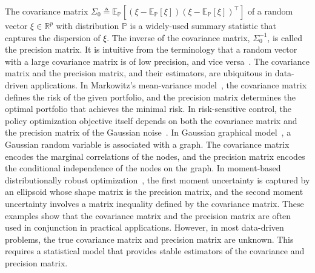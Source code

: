 \documentclass[11pt]{article}
\def\P{\mathbb{P}}
\def\R{\mathbb{R}}
\newcommand{\Let}{\triangleq}
\def\transpose{\top}
\def\P{\mathbb{P}}
\def\PP{\mathbb{P}}
\def\R{\mathbb{R}}
\def\E {\mathbb{E}}
\begin{document}
 The covariance matrix $\Sigma_0\Let\E_{\P}[(\xi-\E_{\P}[\xi])(\xi-\E_{\P}[\xi])^\transpose]$ of a random vector $\xi \in \R^p$ with distribution $\PP$ is a widely-used summary statistic that captures the dispersion of $\xi$. The inverse of the covariance matrix, $\Sigma_0^{-1}$, is called the precision matrix. It is intuitive from the terminology that a random vector with a large covariance matrix is of low precision, and vice versa~\citep{ref:nguyen2022distributionally}. 
The covariance matrix and the precision matrix, and their estimators, are ubiquitous in data-driven applications.
In Markowitz's mean-variance model~\citep{ref:Mark1952}, the covariance matrix defines the risk of the given portfolio, and the precision matrix determines the optimal portfolio that achieves the minimal risk. In risk-sensitive control, the policy optimization objective itself depends on both the covariance matrix and the precision matrix of the Gaussian noise~\citep[Appendix~1]{ref:wang2020game}. In Gaussian graphical model~\citep{ref:yuan2007model,ref:zhao2019cancer}, a Gaussian random variable is associated with a graph. The covariance matrix encodes the marginal correlations of the nodes, and the precision matrix encodes the conditional independence of the nodes on the graph. In moment-based distributionally robust optimization~\citep{ref:Delage2010}, the first moment uncertainty is captured by an ellipsoid whose shape matrix is the precision matrix, and the second moment uncertainty involves a matrix inequality defined by the covariance matrix. 
These examples show that the covariance matrix and the precision matrix are often used in conjunction in practical applications. However, in most data-driven problems, the true covariance matrix and precision matrix are unknown. This requires a statistical model that provides stable estimators of the covariance and precision matrix.
\end{document}

